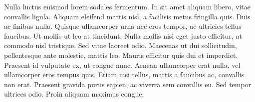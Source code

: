 Nulla luctus euismod lorem sodales fermentum. In sit amet aliquam libero, vitae convallis ligula. Aliquam eleifend mattis nisl, a facilisis metus fringilla quis. Duis ac finibus nulla. Quisque ullamcorper urna nec eros tempor, ac ultricies tellus faucibus. Ut mollis ut leo at tincidunt. Nulla mollis nisi eget justo efficitur, at commodo nisl tristique. Sed vitae laoreet odio. Maecenas ut dui sollicitudin, pellentesque ante molestie, mattis leo. Mauris efficitur quis dui et imperdiet. Praesent id vulputate ex, ut congue nunc. Aenean ullamcorper erat nulla, vel ullamcorper eros tempus quis. Etiam nisi tellus, mattis a faucibus ac, convallis non erat. Praesent gravida purus sapien, ac viverra sem convallis eu. Sed tempor ultrices odio. Proin aliquam maximus congue.